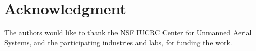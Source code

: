 \documentclass[letterpaper]{article}
\begin{document}
\section*{Acknowledgment}
The authors would like to thank the NSF IUCRC Center for Unmanned Aerial Systems, and the participating industries and labs, for funding the work.






\end{document}
